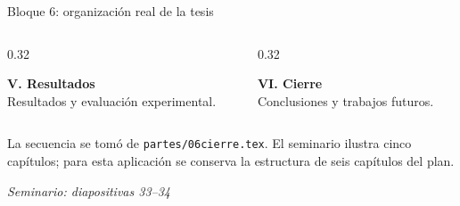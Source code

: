 \documentclass[aspectratio=169,10pt,spanish]{beamer}
\newcommand{\fuente}[1]{\vspace{0.05cm}\hfill{\color{bpNavy!65}\tiny\textit{Seminario: diapositivas #1}}}
\begin{document}
\begin{frame}{Bloque 6: organización real de la tesis}
\begin{columns}[T,onlytextwidth]
\begin{column}{0.32\textwidth}
\begin{tcolorbox}[height=1.65cm,colback=bpGold!9,colframe=bpGold!90!black]
                \centering\small\textbf{\color{bpGold!80!black}V. Resultados}\\[1mm]
                \scriptsize Resultados y evaluación experimental.
            \end{tcolorbox}
        \end{column}
        \begin{column}{0.32\textwidth}
            \begin{tcolorbox}[height=1.65cm,colback=bpGreen!7,colframe=bpGreen]
                \centering\small\textbf{\color{bpGreen}VI. Cierre}\\[1mm]
                \scriptsize Conclusiones y trabajos futuros.
            \end{tcolorbox}
        \end{column}
    \end{columns}
    \vspace{0.16cm}
    \begin{tcolorbox}[colback=bpNavy,colframe=bpNavy,arc=1mm,top=1mm,bottom=1mm]
        \centering\tiny\color{white}
        La secuencia se tomó de \texttt{partes/06cierre.tex}. El seminario ilustra cinco capítulos;
        para esta aplicación se conserva la estructura de seis capítulos del plan.
    \end{tcolorbox}
    \fuente{33--34}
\end{frame}
\end{document}
